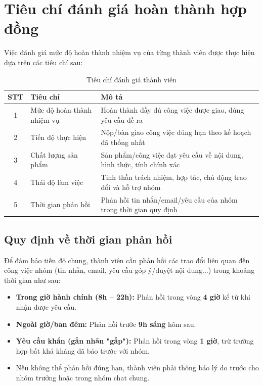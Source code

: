 \section{Tiêu chí đánh giá hoàn thành hợp đồng}

Việc đánh giá mức độ hoàn thành nhiệm vụ của từng thành viên được thực hiện dựa trên các tiêu chí sau:

\begin{table}[h]
\centering
\caption{Tiêu chí đánh giá thành viên}
\begin{tabular}{|c|l|p{7cm}|}
\hline
\textbf{STT} & \textbf{Tiêu chí} & \textbf{Mô tả} \\
\hline
1 & Mức độ hoàn thành nhiệm vụ & Hoàn thành đầy đủ công việc được giao, đúng yêu cầu đề ra \\
\hline
2 & Tiến độ thực hiện & Nộp/bàn giao công việc đúng hạn theo kế hoạch đã thống nhất \\
\hline
3 & Chất lượng sản phẩm & Sản phẩm/công việc đạt yêu cầu về nội dung, hình thức, tính chính xác \\
\hline
4 & Thái độ làm việc & Tinh thần trách nhiệm, hợp tác, chủ động trao đổi và hỗ trợ nhóm \\
\hline
5 & Thời gian phản hồi & Phản hồi tin nhắn/email/yêu cầu của nhóm trong thời gian quy định \\
\hline
\end{tabular}
\end{table}

\subsection{Quy định về thời gian phản hồi}

Để đảm bảo tiến độ chung, thành viên cần phản hồi các trao đổi liên quan đến công việc nhóm (tin nhắn, email, yêu cầu góp ý/duyệt nội dung...) trong khoảng thời gian như sau:

\begin{itemize}
    \item \textbf{Trong giờ hành chính (8h -- 22h):} Phản hồi trong vòng \textbf{4 giờ} kể từ khi nhận được yêu cầu.
    \item \textbf{Ngoài giờ/ban đêm:} Phản hồi trước \textbf{9h sáng} hôm sau.
    \item \textbf{Yêu cầu khẩn (gắn nhãn "gấp"):} Phản hồi trong vòng \textbf{1 giờ}, trừ trường hợp bất khả kháng đã báo trước với nhóm.
    \item Nếu không thể phản hồi đúng hạn, thành viên phải thông báo lý do trước cho nhóm trưởng hoặc trong nhóm chat chung.
\end{itemize}

